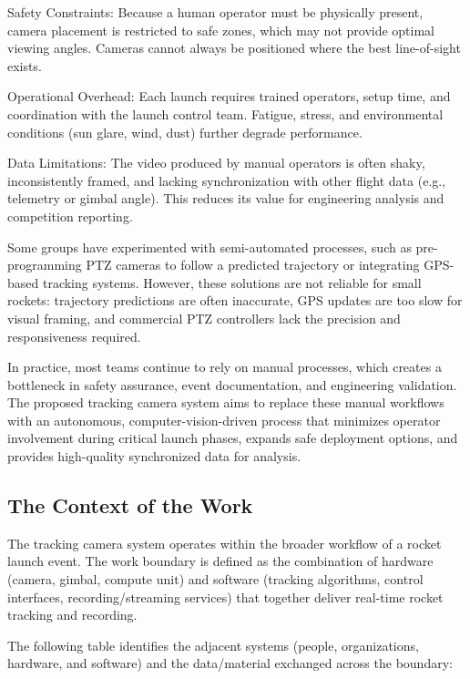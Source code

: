\documentclass[12pt]{article}
\begin{document}
Safety Constraints: Because a human operator must be physically present, camera
placement is restricted to safe zones, which may not provide optimal viewing
angles. Cameras cannot always be positioned where the best line-of-sight
exists.

Operational Overhead: Each launch requires trained operators, setup time, and
coordination with the launch control team. Fatigue, stress, and environmental
conditions (sun glare, wind, dust) further degrade performance.

Data Limitations: The video produced by manual operators is often shaky,
inconsistently framed, and lacking synchronization with other flight data
(e.g., telemetry or gimbal angle). This reduces its value for engineering
analysis and competition reporting.

Some groups have experimented with semi-automated processes, such as
pre-programming PTZ cameras to follow a predicted trajectory or integrating
GPS-based tracking systems. However, these solutions are not reliable for small
rockets: trajectory predictions are often inaccurate, GPS updates are too slow
for visual framing, and commercial PTZ controllers lack the precision and
responsiveness required.

In practice, most teams continue to rely on manual processes, which creates a
bottleneck in safety assurance, event documentation, and engineering
validation. The proposed tracking camera system aims to replace these manual
workflows with an autonomous, computer-vision-driven process that minimizes
operator involvement during critical launch phases, expands safe deployment
options, and provides high-quality synchronized data for analysis.

\subsection{The Context of the Work}

The tracking camera system operates within the broader workflow of a rocket
launch event. The work boundary is defined as the combination of hardware
(camera, gimbal, compute unit) and software (tracking algorithms, control
interfaces, recording/streaming services) that together deliver real-time
rocket tracking and recording.

The following table identifies the adjacent systems (people, organizations,
hardware, and software) and the data/material exchanged across the boundary:
\end{document}
